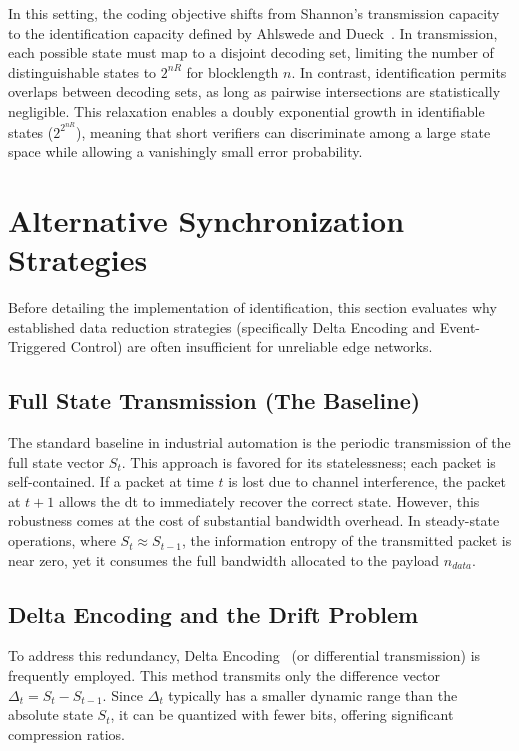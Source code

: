 In this setting, the coding objective shifts from Shannon's transmission capacity to the identification capacity defined by Ahlswede and Dueck~\cite{ahlswede1989}. In transmission, each possible state must map to a disjoint decoding set, limiting the number of distinguishable states to $2^{nR}$ for blocklength $n$. In contrast, identification permits overlaps between decoding sets, as long as pairwise intersections are statistically negligible. This relaxation enables a doubly exponential growth in identifiable states ($2^{2^{nR}}$), meaning that short verifiers can discriminate among a large state space while allowing a vanishingly small error probability.

\section{Alternative Synchronization Strategies}
\label{sec:alternatives}

Before detailing the implementation of identification, this section evaluates why established data reduction strategies (specifically Delta Encoding and Event-Triggered Control) are often insufficient for unreliable edge networks.

\subsection{Full State Transmission (The Baseline)}
The standard baseline in industrial automation is the periodic transmission of the full state vector $S_t$. This approach is favored for its statelessness; each packet is self-contained. If a packet at time $t$ is lost due to channel interference, the packet at $t+1$ allows the \gls{dt} to immediately recover the correct state. However, this robustness comes at the cost of substantial bandwidth overhead. In steady-state operations, where $S_t \approx S_{t-1}$, the information entropy of the transmitted packet is near zero, yet it consumes the full bandwidth allocated to the payload $n_{data}$.

\subsection{Delta Encoding and the Drift Problem}
To address this redundancy, Delta Encoding~\cite{mogul1997potential} (or differential transmission) is frequently employed. This method transmits only the difference vector $\Delta_t = S_t - S_{t-1}$. Since $\Delta_t$ typically has a smaller dynamic range than the absolute state $S_t$, it can be quantized with fewer bits, offering significant compression ratios.


